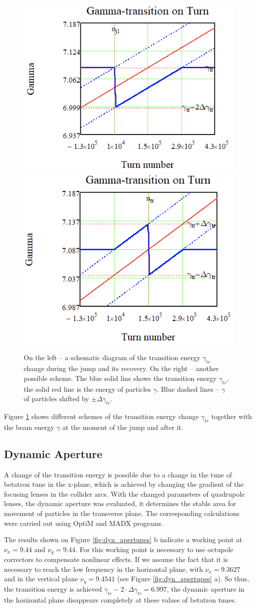 \documentclass[a4paper,
               keeplastbox,   %
               ]{jacow}
\begin{document}
\begin{figure}[!htb]
   \centering
   \includegraphics*[width=.495\columnwidth]{img/WEPOPT004_f1-1}
   \includegraphics*[width=.495\columnwidth]{img/WEPOPT004_f1-2}
   \caption{On the left – a schematic diagram of the transition energy $\gamma_{tr}$ change during the jump and its recovery. On the right – another possible scheme. The blue solid line shows the transition energy $\gamma_{tr}$, the solid red line is the energy of particles $\gamma$. Blue dashed lines – $\gamma$ of particles shifted by $\pm\Delta\gamma_{tr}$.}
   \label{fig:jump_schemes}
\end{figure}

Figure \ref{fig:jump_schemes} shows different schemes of the transition energy change $\gamma_{tr}$ together with the beam energy $\gamma$ at the moment of the jump and after it.

\subsection{Dynamic Aperture}

\par A change of the transition energy is possible due to a change in the tune of betatron tune in the x-plane, which is achieved by changing the gradient of the focusing lenses in the collider arcs. With the changed parameters of quadrupole lenses, the dynamic aperture was evaluated, it determines the stable area for movement of particles in the transverse plane. The corresponding calculations were carried out using OptiM and MADX programs.
\par The results shown on Figure \ref{fig:dyn_apertupes} b indicate a working point at $\nu_{x}=9.44$ and $\nu_{y}=9.44$. For this working point is necessary to use octupole correctors to compensate nonlinear effects. If we assume the fact that it is necessary to reach the low frequency in the horizontal plane, with $\nu_{x}=9.3627$ and in the vertical plane $\nu_{y}=9.4541$ (see Figure \ref{fig:dyn_apertupes} a). So thus, the transition energy is achieved $\gamma_{tr}-2\cdot\Delta\gamma_{tr}=6.997$, the dynamic aperture in the horizontal plane disappears completely at these values of betatron tunes.
\end{document}

